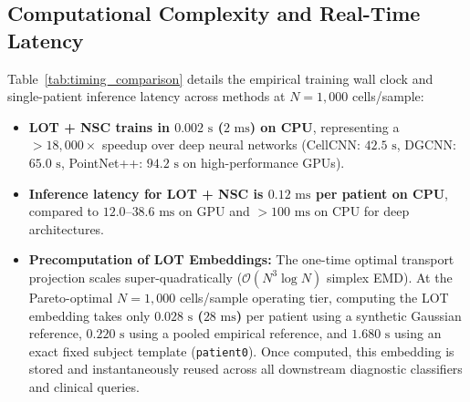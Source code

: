 \documentclass[10pt]{article}
\begin{document}
\subsection{Computational Complexity and Real-Time Latency}
Table~\ref{tab:timing_comparison} details the empirical training wall clock and single-patient inference latency across methods at $N=1{,}000$ cells/sample:
\begin{itemize}\setlength{\itemsep}{1pt}\setlength{\parskip}{0pt}
    \item \textbf{LOT + NSC trains in $0.002\text{ s}$ ($2\text{ ms}$) on CPU}, representing a $>18{,}000\times$ speedup over deep neural networks (CellCNN: $42.5\text{ s}$, DGCNN: $65.0\text{ s}$, PointNet++: $94.2\text{ s}$ on high-performance GPUs).
    \item \textbf{Inference latency for LOT + NSC is $0.12\text{ ms}$ per patient on CPU}, compared to $12.0\text{--}38.6\text{ ms}$ on GPU and $>100\text{ ms}$ on CPU for deep architectures.
    \item \textbf{Precomputation of LOT Embeddings:} The one-time optimal transport projection scales super-quadratically ($\mathcal{O}(N^3 \log N)$ simplex EMD). At the Pareto-optimal $N=1{,}000$ cells/sample operating tier, computing the LOT embedding takes only \textbf{$0.028\text{ s}$ ($28\text{ ms}$)} per patient using a synthetic Gaussian reference, \textbf{$0.220\text{ s}$} using a pooled empirical reference, and \textbf{$1.680\text{ s}$} using an exact fixed subject template (\texttt{patient0}). Once computed, this embedding is stored and instantaneously reused across all downstream diagnostic classifiers and clinical queries.
\end{itemize}

\clearpage
\end{document}
